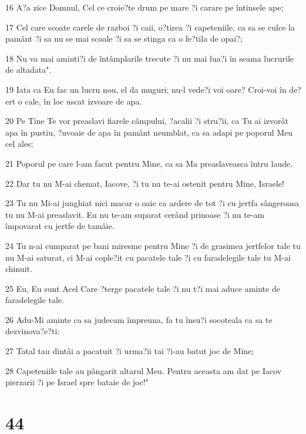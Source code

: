 \par 16 A?a zice Domnul, Cel ce croie?te drum pe mare ?i carare pe întinsele ape;
\par 17 Cel care scoate carele de razboi ?i caii, o?tirea ?i capeteniile, ca sa se culce la pamânt ?i sa nu se mai scoale ?i sa se stinga ca o fe?tila de opai?;
\par 18 Nu va mai aminti?i de întâmplarile trecute ?i nu mai lua?i în seama lucrurile de altadata".
\par 19 Iata ca Eu fac un lucru nou, el da muguri; nu-l vede?i voi oare? Croi-voi în de?ert o cale, în loc uscat izvoare de apa.
\par 20 Pe Tine Te vor preaslavi fiarele câmpului, ?acalii ?i stru?ii, ca Tu ai izvorât apa în pustiu, ?uvoaie de apa în pamânt neumblat, ca sa adapi pe poporul Meu cel ales;
\par 21 Poporul pe care l-am facut pentru Mine, ca sa Ma preaslaveasca întru laude.
\par 22 Dar tu nu M-ai chemat, Iacove, ?i tu nu te-ai ostenit pentru Mine, Israele!
\par 23 Tu nu Mi-ai junghiat nici macar o oaie ca ardere de tot ?i cu jertfa sângeroasa tu nu M-ai preaslavit. Eu nu te-am suparat cerând prinoase ?i nu te-am împovarat cu jertfe de tamâie.
\par 24 Tu n-ai cumparat pe bani miresme pentru Mine ?i de grasimea jertfelor tale tu nu M-ai saturat, ci M-ai cople?it cu pacatele tale ?i cu faradelegile tale tu M-ai chinuit.
\par 25 Eu, Eu sunt Acel Care ?terge pacatele tale ?i nu t?i mai aduce aminte de faradelegile tale.
\par 26 Adu-Mi aminte ca sa judecam împreuna, fa tu însu?i socoteala ca sa te dezvinova?e?ti:
\par 27 Tatal tau dintâi a pacatuit ?i urma?ii tai ?i-au batut joc de Mine;
\par 28 Capeteniile tale au pângarit altarul Meu. Pentru aceasta am dat pe Iacov pierzarii ?i pe Israel spre bataie de joc!"

\chapter{44}

